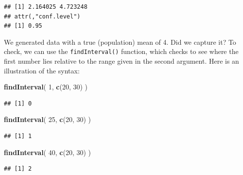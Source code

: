 \documentclass[
]{book}
\newenvironment{Shaded}{\begin{snugshade}}{\end{snugshade}}
\newcommand{\CommentTok}[1]{\textcolor[rgb]{0.56,0.35,0.01}{\textit{#1}}}
\newcommand{\DecValTok}[1]{\textcolor[rgb]{0.00,0.00,0.81}{#1}}
\newcommand{\FunctionTok}[1]{\textcolor[rgb]{0.13,0.29,0.53}{\textbf{#1}}}
\newcommand{\NormalTok}[1]{#1}
\newcommand{\SpecialCharTok}[1]{\textcolor[rgb]{0.81,0.36,0.00}{\textbf{#1}}}
\begin{document}
\begin{Shaded}
\end{Shaded}

\begin{verbatim}
## [1] 2.164025 4.723248
## attr(,"conf.level")
## [1] 0.95
\end{verbatim}

We generated data with a true (population) mean of 4. Did we capture it? To check, we can use the \texttt{findInterval()} function, which checks to see where the first number lies relative to the range given in the second argument.
Here is an illustration of the syntax:

\begin{Shaded}
\begin{Highlighting}[]
\FunctionTok{findInterval}\NormalTok{( }\DecValTok{1}\NormalTok{, }\FunctionTok{c}\NormalTok{(}\DecValTok{20}\NormalTok{, }\DecValTok{30}\NormalTok{) )}
\end{Highlighting}
\end{Shaded}

\begin{verbatim}
## [1] 0
\end{verbatim}

\begin{Shaded}
\begin{Highlighting}[]
\FunctionTok{findInterval}\NormalTok{( }\DecValTok{25}\NormalTok{, }\FunctionTok{c}\NormalTok{(}\DecValTok{20}\NormalTok{, }\DecValTok{30}\NormalTok{) )}
\end{Highlighting}
\end{Shaded}

\begin{verbatim}
## [1] 1
\end{verbatim}

\begin{Shaded}
\begin{Highlighting}[]
\FunctionTok{findInterval}\NormalTok{( }\DecValTok{40}\NormalTok{, }\FunctionTok{c}\NormalTok{(}\DecValTok{20}\NormalTok{, }\DecValTok{30}\NormalTok{) )}
\end{Highlighting}
\end{Shaded}

\begin{verbatim}
## [1] 2
\end{verbatim}
\end{document}
